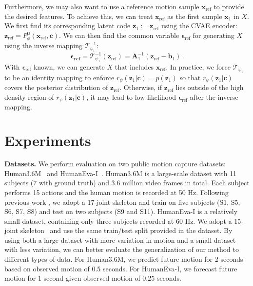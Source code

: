 \documentclass[runningheads]{llncs}
\begin{document}
	Furthermore, we may also want to use a reference motion sample $\mathbf{x}_\text{ref}$ to provide the desired features. To achieve this, we can treat $\mathbf{x}_\text{ref}$ as the first sample $\mathbf{x}_1$ in $X$. We first find its corresponding latent code $\mathbf{z}_1 := \mathbf{z}_\text{ref}$ using the CVAE encoder: $\mathbf{z}_\text{ref} =F_\phi^{\boldsymbol{\mu}}(\mathbf{x}_\text{ref}, \mathbf{c})$. We can then find the common variable $\boldsymbol{\epsilon}_\text{ref}$ for generating $X$ using the inverse mapping $\mathcal{T}_{\psi_1}^{-1}$:
	\begin{equation}
	\boldsymbol{\epsilon_\text{ref}} = \mathcal{T}_{\psi_1}^{-1}(\mathbf{z}_\text{ref}) = \mathbf{A}_1^{-1}(\mathbf{z}_\text{ref} - \mathbf{b}_1)\,.
	\end{equation}
	With $\boldsymbol{\epsilon}_\text{ref}$ known, we can generate $X$ that includes $\mathbf{x}_\text{ref}$.
	In practice, we force $\mathcal{T}_{\psi_1}$ to be an identity mapping to enforce $r_\psi(\mathbf{z}_1|\mathbf{c}) = p(\mathbf{z}_1)$ so that $r_\psi(\mathbf{z}_1|\mathbf{c})$ covers the posterior distribution of $\mathbf{z}_\text{ref}$. Otherwise, if $\mathbf{z}_\text{ref}$ lies outside of the high density region of $r_\psi(\mathbf{z}_1|\mathbf{c})$, it may lead to low-likelihood $\boldsymbol{\epsilon}_\text{ref}$ after the inverse mapping.
	
	
	\vspace{-3mm}
	\section{Experiments}
	\vspace{-2mm}
	
	\noindent\textbf{Datasets.}
	We perform evaluation on two public motion capture datasets: Human3.6M~\cite{ionescu2013human3} and HumanEva-I~\cite{sigal2010humaneva}. Human3.6M is a large-scale dataset with 11 subjects (7 with ground truth) and 3.6 million video frames in total. Each subject performs 15 actions and the human motion is recorded at 50 Hz. Following previous work \cite{martinez2017simple,luvizon20182d,yang20183d,pavllo20193d}, we adopt a 17-joint skeleton and train on five subjects (S1, S5, S6, S7, S8) and test on two subjects (S9 and S11). HumanEva-I is a relatively small dataset, containing only three subjects recorded at 60 Hz. We adopt a 15-joint skeleton~\cite{pavllo20193d} and use the same train/test split provided in the dataset. By using both a large dataset with more variation in motion and a small dataset with less variation, we can better evaluate the generalization of our method to different types of data. For Human3.6M, we predict future motion for 2 seconds based on observed motion of 0.5 seconds. For HumanEva-I, we forecast future motion for 1 second given observed motion of 0.25 seconds.
	
\end{document}
